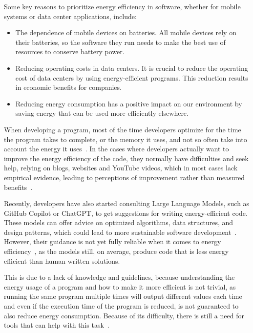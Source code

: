 Some key reasons to prioritize energy efficiency in software, whether for mobile systems or data center applications, include:

\begin{itemize}
  \item The dependence of mobile devices on batteries. All mobile devices rely on their batteries, so the software they run needs to make the best use of resources to conserve battery power.
  \item Reducing operating costs in data centers. It is crucial to reduce the operating cost of data centers by using energy-efficient programs. This reduction results in economic benefits for companies. 
  \item Reducing energy consumption has a positive impact on our environment by saving energy that can be used more efficiently elsewhere. 
\end{itemize}

When developing a program, most of the time developers optimize for the time the program takes to complete, or the memory it uses, and not so often take into account the energy it uses~\cite{10.1145/1666420.1666438}. 
In the cases where developers actually want to improve the energy efficiency of the code, they normally have difficulties and seek help, relying on blogs, websites and YouTube videos, which in most cases lack empirical evidence, leading to perceptions of improvement rather than measured benefits~\cite{10.1145/3154384}.

Recently, developers have also started consulting Large Language Models, such as GitHub Copilot or ChatGPT, to get suggestions for writing energy-efficient code. These models can offer advice on optimized algorithms, data structures, and design patterns, which could lead to more sustainable software development~\cite{vartziotis2024carbon,rani2025can}.
However, their guidance is not yet fully reliable when it comes to energy efficiency~\cite{islam2025evaluating}, as the models still, on average, produce code that is less energy efficient than human written solutions.

This is due to a lack of knowledge and guidelines, because understanding the energy usage of a program and how to make it more efficient is not trivial, as running the same program multiple times will output different values each time and even if the execution time of the program is reduced, is not guaranteed to also reduce energy consumption. Because of its difficulty, there is still a need for tools that can help with this task~\cite{10.1145/2597073.2597110}. 

